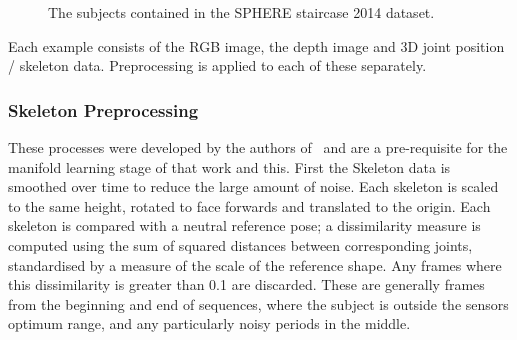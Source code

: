 \documentclass[11pt]{article} %
\begin{document}
\begin{figure}
\qquad
{}%
\qquad
{}%
\qquad
{}%
\caption{The subjects contained in the SPHERE staircase 2014 dataset.}
\label{fig:subjects}
\end{figure}

Each example consists of the RGB image, the depth image and 3D joint position / skeleton data. Preprocessing is applied to each of these separately.

\subsubsection{Skeleton Preprocessing}
\label{sec:skelPreproc}

These processes were developed by the authors of~\cite{Paiement} and are a pre-requisite for the manifold learning stage of that work and this. First the Skeleton data is smoothed over time to reduce the large amount of noise. Each skeleton is scaled to the same height, rotated to face forwards and translated to the origin. Each skeleton is compared with a neutral reference pose;  a dissimilarity measure is computed  using the sum of squared distances between corresponding joints, standardised by a measure of the scale of the reference shape. Any frames where this dissimilarity is greater than 0.1 are discarded. These are generally frames from the beginning and end of sequences, where the subject is outside the sensors optimum range, and any particularly noisy periods in the middle. 
\end{document}
